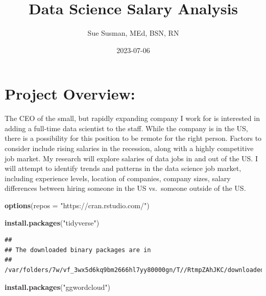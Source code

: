 \documentclass[
]{article}
\title{Data Science Salary Analysis}
\author{Sue Susman, MEd, BSN, RN}
\date{2023-07-06}
\newenvironment{Shaded}{\begin{snugshade}}{\end{snugshade}}
\newcommand{\AttributeTok}[1]{\textcolor[rgb]{0.13,0.29,0.53}{#1}}
\newcommand{\FunctionTok}[1]{\textcolor[rgb]{0.13,0.29,0.53}{\textbf{#1}}}
\newcommand{\NormalTok}[1]{#1}
\newcommand{\StringTok}[1]{\textcolor[rgb]{0.31,0.60,0.02}{#1}}
\begin{document}
\maketitle

{
\setcounter{tocdepth}{6}
\tableofcontents
}
\hypertarget{project-overview}{%
\section{Project Overview:}\label{project-overview}}

The CEO of the small, but rapidly expanding company I work for is
interested in adding a full-time data scientist to the staff. While the
company is in the US, there is a possibility for this position to be
remote for the right person. Factors to consider include rising salaries
in the recession, along with a highly competitive job market. My
research will explore salaries of data jobs in and out of the US. I will
attempt to identify trends and patterns in the data science job market,
including experience levels, location of companies, company sizes,
salary differences between hiring someone in the US vs.~someone outside
of the US.

\begin{Shaded}
\begin{Highlighting}[]
\FunctionTok{options}\NormalTok{(}\AttributeTok{repos =} \StringTok{"https://cran.rstudio.com/"}\NormalTok{)}
\end{Highlighting}
\end{Shaded}

\begin{Shaded}
\begin{Highlighting}[]
    \FunctionTok{install.packages}\NormalTok{(}\StringTok{"tidyverse"}\NormalTok{)}
\end{Highlighting}
\end{Shaded}

\begin{verbatim}
## 
## The downloaded binary packages are in
##  /var/folders/7w/vf_3wx5d6kq9bm2666hl7yy80000gn/T//RtmpZAhJKC/downloaded_packages
\end{verbatim}

\begin{Shaded}
\begin{Highlighting}[]
    \FunctionTok{install.packages}\NormalTok{(}\StringTok{"ggwordcloud"}\NormalTok{)}
\end{Highlighting}
\end{Shaded}
\end{document}
